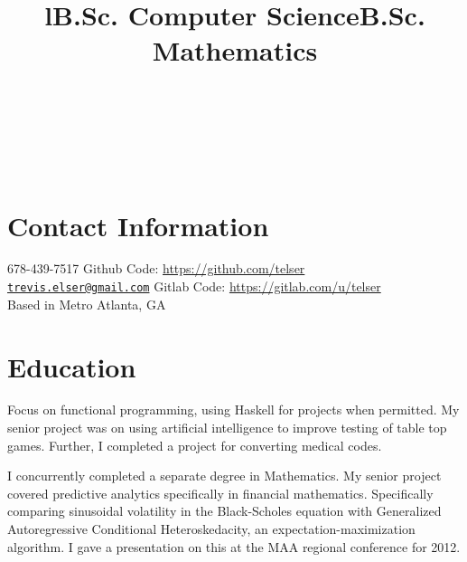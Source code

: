 \documentclass[margintitle,line]{res}
\begin{document}

\begin{resume}

\begin{format}
\title{l}\\
\\
\body\\
\end{format}

\section{Contact Information}

678-439-7517  \hfill {Github Code:} \href{https://github.com/telser}{https://github.com/telser}  \\
\href{mailto:trevis.elser@gmail.com}{\nolinkurl{trevis.elser@gmail.com}} \hfill {Gitlab Code:}
\href{https://gitlab.com/u/telser}{https://gitlab.com/u/telser} \\
Based in Metro Atlanta, GA

\section{Education}

\title{B.Sc. Computer Science}
\begin{position}
Focus on functional programming, using Haskell for projects when
permitted. My senior project was on using artificial intelligence to
improve testing of table top games. Further, I completed a project for
converting medical codes.
\end{position}

\title{B.Sc. Mathematics}
\begin{position}
I concurrently completed a separate degree in Mathematics. My senior
project covered predictive analytics specifically in financial
mathematics. Specifically comparing sinusoidal volatility in the
Black-Scholes equation with Generalized Autoregressive Conditional
Heteroskedacity, an expectation-maximization algorithm. I gave a presentation
on this at the MAA regional conference for 2012.
\end{position}


\end{resume}
\end{document}
